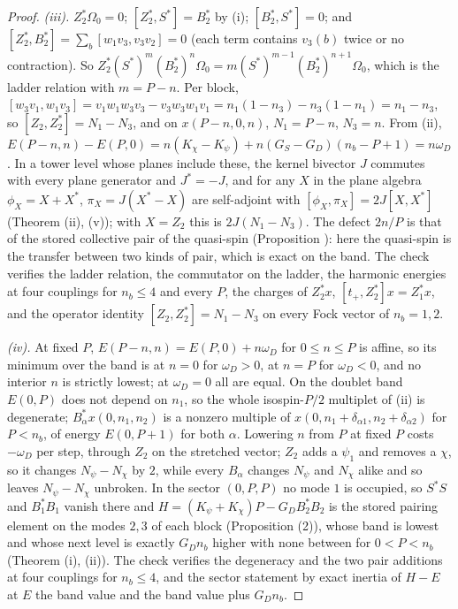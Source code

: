\begin{proof}
\emph{(iii).} $Z_{2}^{*}\Omega_{0} = 0$; $[Z_{2}^{*}, S^{*}] = B_{2}^{*}$ by (i); $[B_{2}^{*}, S^{*}] = 0$; and $[Z_{2}^{*}, B_{2}^{*}] = \sum_{b}[w_{1}v_{3}, v_{3}v_{2}] = 0$ (each term contains $v_{3}(b)$ twice or no contraction). So $Z_{2}^{*}(S^{*})^{m}(B_{2}^{*})^{n}\Omega_{0} = m(S^{*})^{m - 1}(B_{2}^{*})^{n + 1}\Omega_{0}$, which is the ladder relation with $m = P - n$. Per block, $[w_{3}v_{1}, w_{1}v_{3}] = v_{1}w_{1}w_{3}v_{3} - v_{3}w_{3}w_{1}v_{1} = n_{1}(1 - n_{3}) - n_{3}(1 - n_{1}) = n_{1} - n_{3}$, so $[Z_{2}, Z_{2}^{*}] = N_{1} - N_{3}$, and on $x(P - n, 0, n)$, $N_{1} = P - n$, $N_{3} = n$. From (ii), $E(P - n, n) - E(P, 0) = n(K_{\chi} - K_{\psi}) + n(G_{S} - G_{D})(n_{b} - P + 1) = n\omega_{D}$. In a tower level whose planes include these, the kernel bivector $J$ commutes with every plane generator and $J^{*} = -J$, and for any $X$ in the plane algebra $\phi_{X} = X + X^{*}$, $\pi_{X} = J(X^{*} - X)$ are self-adjoint with $[\phi_{X}, \pi_{X}] = 2J[X, X^{*}]$ (Theorem (ii), (v)); with $X = Z_{2}$ this is $2J(N_{1} - N_{3})$. The defect $2n/P$ is that of the stored collective pair of the quasi-spin (Proposition ): here the quasi-spin is the transfer between two kinds of pair, which is exact on the band. The check verifies the ladder relation, the commutator on the ladder, the harmonic energies at four couplings for $n_{b} \le 4$ and every $P$, the charges of $Z_{2}^{*}x$, $[t_{+}, Z_{2}^{*}]x = Z_{1}^{*}x$, and the operator identity $[Z_{2}, Z_{2}^{*}] = N_{1} - N_{3}$ on every Fock vector of $n_{b} = 1, 2$.

\emph{(iv).} At fixed $P$, $E(P - n, n) = E(P, 0) + n\omega_{D}$ for $0 \le n \le P$ is affine, so its minimum over the band is at $n = 0$ for $\omega_{D} > 0$, at $n = P$ for $\omega_{D} < 0$, and no interior $n$ is strictly lowest; at $\omega_{D} = 0$ all are equal. On the doublet band $E(0, P)$ does not depend on $n_{1}$, so the whole isospin-$P/2$ multiplet of (ii) is degenerate; $B_{\alpha}^{*}x(0, n_{1}, n_{2})$ is a nonzero multiple of $x(0, n_{1} + \delta_{\alpha1}, n_{2} + \delta_{\alpha2})$ for $P < n_{b}$, of energy $E(0, P + 1)$ for both $\alpha$. Lowering $n$ from $P$ at fixed $P$ costs $-\omega_{D}$ per step, through $Z_{2}$ on the stretched vector; $Z_{2}$ adds a $\psi_{1}$ and removes a $\chi$, so it changes $N_{\psi} - N_{\chi}$ by $2$, while every $B_{\alpha}$ changes $N_{\psi}$ and $N_{\chi}$ alike and so leaves $N_{\psi} - N_{\chi}$ unbroken. In the sector $(0, P, P)$ no mode $1$ is occupied, so $S^{*}S$ and $B_{1}^{*}B_{1}$ vanish there and $H = (K_{\psi} + K_{\chi})P - G_{D}B_{2}^{*}B_{2}$ is the stored pairing element on the modes $2, 3$ of each block (Proposition (2)), whose band is lowest and whose next level is exactly $G_{D}n_{b}$ higher with none between for $0 < P < n_{b}$ (Theorem (i), (ii)). The check verifies the degeneracy and the two pair additions at four couplings for $n_{b} \le 4$, and the sector statement by exact inertia of $H - E$ at $E$ the band value and the band value plus $G_{D}n_{b}$.


\end{proof}
